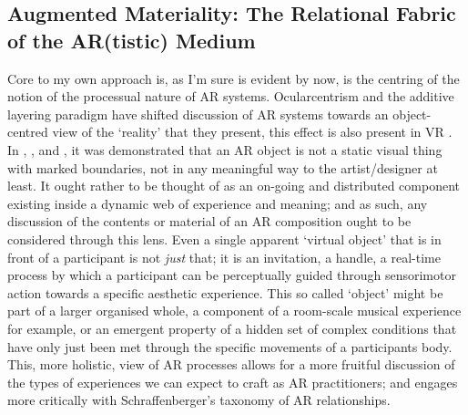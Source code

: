 \subsection[Augmented Materiality]{Augmented Materiality: The Relational Fabric of the AR(tistic) Medium} \label{sec: discussion-medium-material}
Core to my own approach is, as I'm sure is evident by now, is the centring of the notion of the processual nature of AR systems. Ocularcentrism and the additive layering paradigm have shifted discussion of AR systems towards an object-centred view of the `reality' that they present, this effect is also present in VR \citep[]{hovhannisyan2019}. In \textit{}, \textit{}, and \textit{}, it was demonstrated that an AR object is not a static visual thing with marked boundaries, not in any meaningful way to the artist/designer at least. It ought rather to be thought of as an on-going and distributed component existing inside a dynamic web of experience and meaning; and as such, any discussion of the contents or material of an AR composition ought to be considered through this lens. Even a single apparent `virtual object' that is in front of a participant is not \textit{just} that; it is an invitation, a handle, a real-time process by which a participant can be perceptually guided through sensorimotor action towards a specific aesthetic experience. This so called `object' might be part of a larger organised whole, a component of a room-scale musical experience for example, or an emergent property of a hidden set of complex conditions that have only just been met through the specific movements of a participants body. This, more holistic, view of AR processes allows for a more fruitful discussion of the types of experiences we can expect to craft as AR practitioners; and engages more critically with Schraffenberger's taxonomy of AR relationships.

